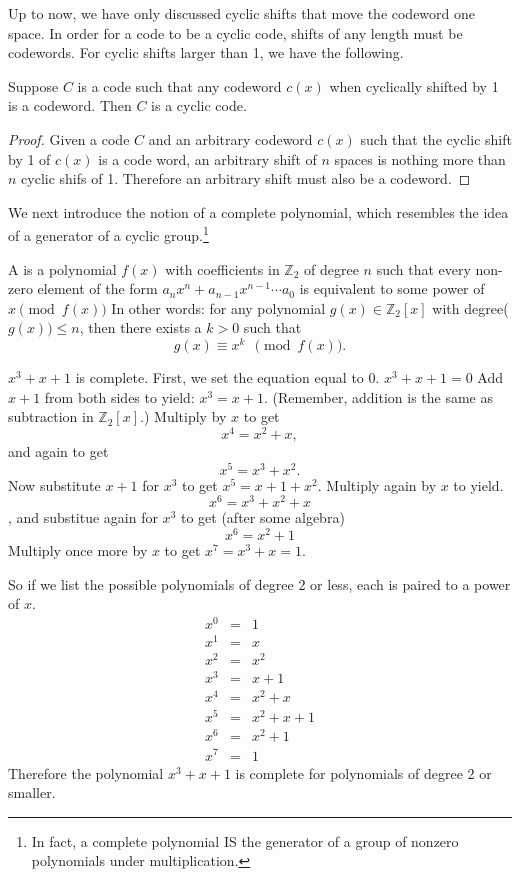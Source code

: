 Up to now, we have only discussed cyclic shifts that move the codeword one space.  In order for a code to be a cyclic code, shifts of any length must be codewords.  For cyclic shifts larger than 1, we have the following.

\begin{prop}{}
Suppose $C$ is a code such that any codeword $c(x)$ when cyclically shifted by 1 is a codeword. Then $C$ is a cyclic code.
\end {prop}
\begin{proof}
Given a code $C$ and an arbitrary codeword $c(x)$ such that the cyclic shift by 1 of $c(x)$ is a code word, an arbitrary shift of $n$ spaces is nothing more than $n$ cyclic shifs of 1.  Therefore an arbitrary shift must also be a codeword.
\end {proof}

We next introduce the notion of a complete polynomial, which resembles the idea of a generator of a cyclic group.\footnote{In fact, a complete polynomial IS the generator of a group of nonzero polynomials under multiplication.} 

\begin{defn}
A   is a polynomial $f(x)$ with coefficients in $\mathbb{Z}_2$ of degree $n$ such that every non-zero element of the form $a_nx^n + a_{n-1}x^{n-1} \cdots a_0$ is equivalent to some power of $x  \pmod{f(x)}$  In other words: for any polynomial $g(x) \in  
\mathbb{Z}_2[x]$ with degree($g(x)) \le n$, then there exists a $k >0$ such that
\[ g(x) \equiv x^k~~\pmod{f(x)}. \]
\end{defn}

\begin{example}{}
$x^3 + x + 1$ is complete.  First, we set the equation equal to 0. $x^3 + x + 1=0$ Add $x+1$ from both sides to yield: $x^3 = x+1$. (Remember, addition is the same as subtraction in $\mathbb{Z}_2[x]$.) Multiply by $x$ to get
\[x^4 = x^2 + x,\]
and again to get
\[x^5 = x^3 + x^2.\] 
Now substitute $x+1$ for $x^3$ to get $x^5 = x + 1 + x^2$. Multiply again by $x$ to yield.
\[x^6 = x^3 + x^2 + x\], 
and substitue again for $x^3$ to get (after some algebra)
\[x^6 = x^2 + 1\]
Multiply once more by $x$ to get $x^7 = x^3 + x = 1.$

So if we list the possible polynomials of degree 2 or less, each is paired to a power of $x$.
\[
\begin{array}{lcr}
x^0 & = & 1 \\
x^1 & = & x \\ 
x^2 & = & x^2 \\ 
x^3 & = & x+1 \\ 
x^4 & = & x^2 + x \\ 
x^5 & = & x^2 + x + 1 \\ 
x^6 & = & x^2 + 1 \\ 
x^7 & = & 1 
\end{array}\]
Therefore the polynomial $x^3 + x + 1$ is complete for polynomials of degree 2 or smaller.  
\end {example}

